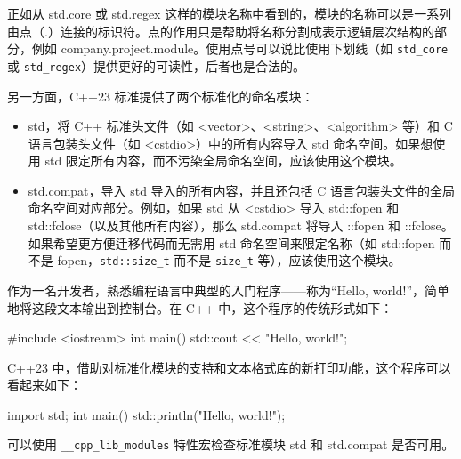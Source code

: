 正如从 std.core 或 std.regex 这样的模块名称中看到的，模块的名称可以是一系列由点（.）连接的标识符。点的作用只是帮助将名称分割成表示逻辑层次结构的部分，例如 company.project.module。使用点号可以说比使用下划线（如 \verb|std_core| 或 \verb|std_regex|）提供更好的可读性，后者也是合法的。

另一方面，C++23 标准提供了两个标准化的命名模块：

\begin{itemize}
\item
std，将 C++ 标准头文件（如 <vector>、<string>、<algorithm> 等）和 C 语言包装头文件（如 <cstdio>）中的所有内容导入 std 命名空间。如果想使用 std 限定所有内容，而不污染全局命名空间，应该使用这个模块。

\item
std.compat，导入 std 导入的所有内容，并且还包括 C 语言包装头文件的全局命名空间对应部分。例如，如果 std 从 <cstdio> 导入 std::fopen 和 std::fclose（以及其他所有内容），那么 std.compat 将导入 ::fopen 和 ::fclose。如果希望更方便迁移代码而无需用 std 命名空间来限定名称（如 std::fopen 而不是 fopen，\verb|std::size_t| 而不是 \verb|size_t| 等），应该使用这个模块。
\end{itemize}

作为一名开发者，熟悉编程语言中典型的入门程序——称为“Hello, world!”，简单地将这段文本输出到控制台。在 C++ 中，这个程序的传统形式如下：

\begin{cpp}
#include <iostream>
int main()
{
    std::cout << "Hello, world!\n";
}
\end{cpp}

C++23 中，借助对标准化模块的支持和文本格式库的新打印功能，这个程序可以看起来如下：

\begin{cpp}
import std;
int main()
{
    std::println("Hello, world!");
}
\end{cpp}

可以使用 \verb|__cpp_lib_modules| 特性宏检查标准模块 std 和 std.compat 是否可用。



